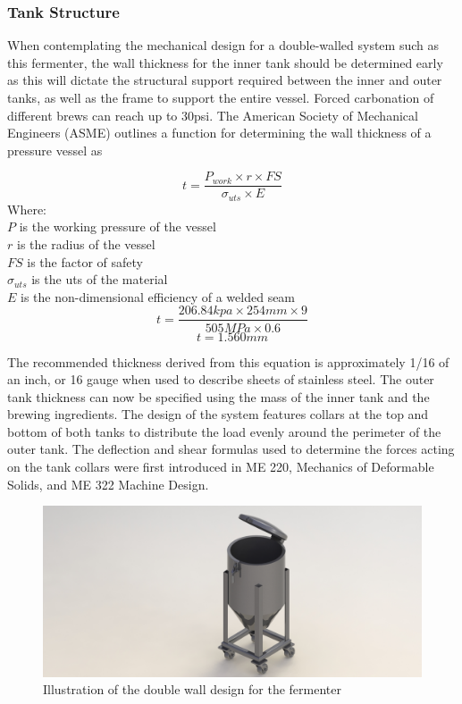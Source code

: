 \documentclass{article}
\begin{document}
\subsubsection{Tank Structure}
When contemplating the mechanical design for a double-walled system such as this fermenter, the wall thickness for the inner tank should be determined early as this will dictate the structural support required between the inner and outer tanks, as well as the frame to support the entire vessel. Forced carbonation of different brews can reach up to 30psi.  The American Society of Mechanical Engineers (ASME) outlines a function for determining the wall thickness of a pressure vessel as

\begin{equation}
t = \frac{P_{work} \times r \times FS}{\sigma_{uts} \times E}
\end{equation}
\noindent Where: \\
$P$ is the working pressure of the vessel\\
$r$ is the radius of the vessel\\
$FS$ is the factor of safety\\
$­\sigma_{uts}$ is the \gls{uts} of the material\\
$E$ is the non-dimensional efficiency of a welded seam\\

\begin{equation}
t = \frac{206.84kpa \times 254mm \times 9}{505MPa \times 0.6}
\end{equation}
\begin{equation}
t = 1.560mm
\end{equation}

The recommended thickness derived from this equation is approximately 1/16 of an inch, or 16 gauge when used to describe sheets of stainless steel.
The outer tank thickness can now be specified using the mass of the inner tank and the brewing ingredients.  The design of the system features collars at the top and bottom of both tanks to distribute the load evenly around the perimeter of the outer tank.  The deflection and shear formulas used to determine the forces acting on the tank collars were first introduced in ME 220, Mechanics of Deformable Solids, and ME 322 Machine Design.

\begin{figure}[H]
\begin{center}
\includegraphics[scale=0.20]{fermenter-cad.png}
\caption{Illustration of the double wall design for the fermenter}
\label{fig:fermenter-cad}
\end{center}
\end{figure}
\end{document}
